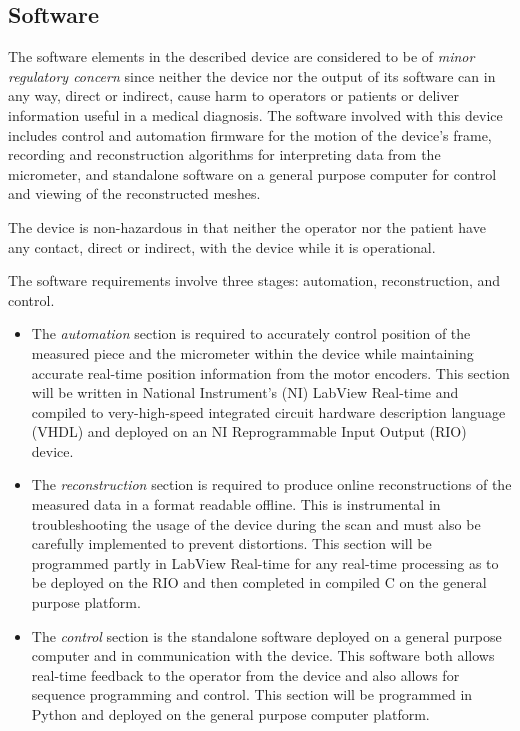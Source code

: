 \documentclass{article}
\begin{document}
\newpage

\newpage

\newpage

\newpage
\subsection{Software}

The software elements in the described device are considered to be of
\textit{minor regulatory concern} since neither the device nor the
output of its software can in any way, direct or indirect, cause harm
to operators or patients or deliver information useful in a medical
diagnosis. The software involved with this device includes control and
automation firmware for the motion of the device's frame, recording
and reconstruction algorithms for interpreting data from the
micrometer, and standalone software on a general purpose computer for
control and viewing of the reconstructed meshes.

The device is non-hazardous in that neither the operator nor the
patient have any contact, direct or indirect, with the device while it
is operational.

The software requirements involve three stages: automation,
reconstruction, and control. 

\begin{itemize}
\item The \textit{automation} section is required to accurately
  control position of the measured piece and the micrometer within the
  device while maintaining accurate real-time position information from
  the motor encoders. This section will be written in National
  Instrument's (NI) LabView Real-time and compiled to very-high-speed
  integrated circuit hardware description language (VHDL) and deployed
  on an NI Reprogrammable Input Output (RIO) device.
\item The \textit{reconstruction} section is required to produce
  online reconstructions of the measured data in a format readable
  offline. This is instrumental in troubleshooting the usage of the
  device during the scan and must also be carefully implemented to
  prevent distortions. This section will be programmed partly in
  LabView Real-time for any real-time processing as to be deployed on
  the RIO and then completed in compiled C on the general purpose
  platform.
\item The \textit{control} section is the standalone software deployed
  on a general purpose computer and in communication with the
  device. This software both allows real-time feedback to the operator
  from the device and also allows for sequence programming and
  control. This section will be programmed in Python and deployed on
  the general purpose computer platform.
\end{itemize}
\end{document}
